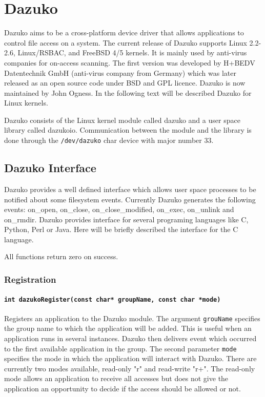 \chapter{Dazuko}
\label{lab:dazuko}
Dazuko aims to be a cross-platform device driver that allows applications to control
file access on a system. The current release of Dazuko supports Linux 2.2-2.6,
Linux/RSBAC, and FreeBSD 4/5 kernels. It is mainly used by anti-virus companies for
on-access scanning. The first version was developed by H+BEDV Datentechnik GmbH (anti-virus
company from Germany) which was later released as an open source code under BSD and
GPL licence. Dazuko is now maintained by John Ogness. In the following text
will be described Dazuko for Linux kernels.

Dazuko consists of the Linux kernel module called dazuko and a user space library called
dazukoio. Communication between the module and the library is done through
the \texttt{/dev/dazuko} char device with major number 33. 

\section{Dazuko Interface}
Dazuko provides a well defined interface which allows user space processes to be
notified about some filesystem events. Currently Dazuko generates the following
events: on\_open, on\_close, on\_close\_modified, on\_exec, on\_unlink and on\_rmdir.
Dazuko provides interface for several programing languages like C, Python, Perl or
Java. Here will be briefly described the interface for the C language.

All functions return zero on success.

\subsection*{Registration}
\subsubsection{\texttt{int dazukoRegister(const char* groupName, const char *mode)}}
Registers an application to the Dazuko module. The argument \texttt{grouName}
specifies the group
name to which the application will be added. This is useful when an application runs in
several instances. Dazuko then delivers event which occurred to the first available
application in the group. The second parameter \texttt{mode} specifies the mode in
which the application will interact with Dazuko. There are currently two modes
available, read-only "r" and read-write "r+". The read-only mode allows an application
to receive all accesses but does not give the application an opportunity to decide if
the access should be allowed or not.

